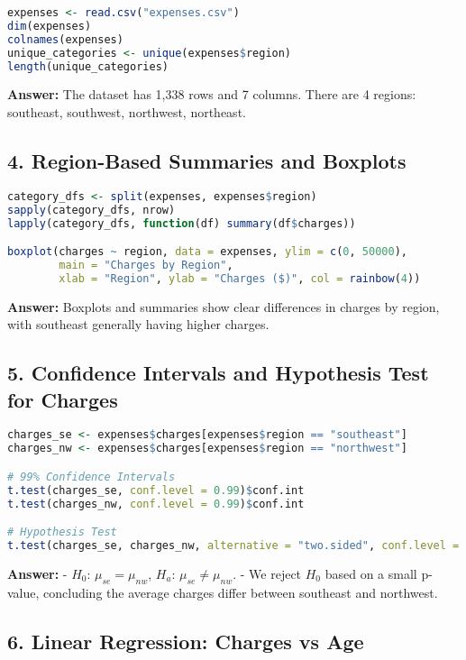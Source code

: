 \documentclass{article}
\begin{document}
\begin{lstlisting}[language=R]
expenses <- read.csv("expenses.csv")
dim(expenses)
colnames(expenses)
unique_categories <- unique(expenses$region)
length(unique_categories)
\end{lstlisting}

\textbf{Answer:} The dataset has 1,338 rows and 7 columns. There are 4 regions: southeast, southwest, northwest, northeast.

\subsection*{4. Region-Based Summaries and Boxplots}

\begin{lstlisting}[language=R]
category_dfs <- split(expenses, expenses$region)
sapply(category_dfs, nrow)
lapply(category_dfs, function(df) summary(df$charges))

boxplot(charges ~ region, data = expenses, ylim = c(0, 50000),
        main = "Charges by Region",
        xlab = "Region", ylab = "Charges ($)", col = rainbow(4))
\end{lstlisting}

\textbf{Answer:} Boxplots and summaries show clear differences in charges by region, with southeast generally having higher charges.

\subsection*{5. Confidence Intervals and Hypothesis Test for Charges}

\begin{lstlisting}[language=R]
charges_se <- expenses$charges[expenses$region == "southeast"]
charges_nw <- expenses$charges[expenses$region == "northwest"]

# 99% Confidence Intervals
t.test(charges_se, conf.level = 0.99)$conf.int
t.test(charges_nw, conf.level = 0.99)$conf.int

# Hypothesis Test
t.test(charges_se, charges_nw, alternative = "two.sided", conf.level = 0.95)
\end{lstlisting}

\textbf{Answer:}  
- $H_0$: $\mu_{se} = \mu_{nw}$, $H_a$: $\mu_{se} \ne \mu_{nw}$.  
- We reject $H_0$ based on a small p-value, concluding the average charges differ between southeast and northwest.

\subsection*{6. Linear Regression: Charges vs Age}
\end{document}

